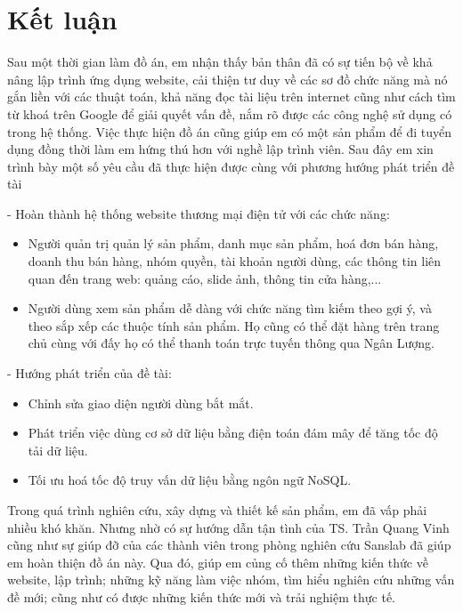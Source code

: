 \thispagestyle{plain}
\chapter*{Kết luận}
Sau một thời gian làm đồ án, em nhận thấy bản thân đã có sự tiến bộ về khả nâng lập trình ứng dụng website, cải thiện tư duy về các sơ đồ chức năng mà nó gắn liền với các thuật toán, khả năng đọc tài liệu trên internet cũng như cách tìm từ khoá trên Google để giải quyết vấn đề, nắm rõ được các công nghệ sử dụng có trong hệ thống. Việc thực hiện đồ án cũng giúp em có một sản phẩm để đi tuyển dụng đồng thời làm em hứng thú hơn với nghề lập trình viên. Sau đây em xin trình bày một số yêu cầu đã thực hiện được cùng với phương hướng phát triển đề tài
\par
- Hoàn thành hệ thống website thương mại điện tử với các chức năng:
\begin{itemize}
	\item Người quản trị quản lý sản phẩm, danh mục sản phẩm, hoá đơn bán hàng, doanh thu bán hàng, nhóm quyền, tài khoản người dùng, các thông tin liên quan đến trang web: quảng cáo, slide ảnh, thông tin cửa hàng,...
	\item Người dùng xem sản phẩm dễ dàng với chức năng tìm kiếm theo gợi ý, và theo sắp xếp các thuộc tính sản phẩm. Họ cũng có thể đặt hàng trên trang chủ cùng với đấy họ có thể thanh toán trực tuyến thông qua Ngân Lượng.
\end{itemize}

- Hướng phát triển của đề tài:
\begin{itemize}
\item Chỉnh sửa giao diện người dùng bắt mắt.
\item Phát triển việc dùng cơ sở dữ liệu bằng điện toán đám mây để tăng tốc độ tải dữ liệu.
\item Tối ưu hoá tốc độ truy vấn dữ liệu bằng ngôn ngữ NoSQL.
\end{itemize}
\par 
Trong quá trình nghiên cứu, xây dựng và thiết kế sản phẩm, em đã vấp phải nhiều khó khăn. Nhưng nhờ có sự hướng dẫn tận tình của TS. Trần Quang Vinh cũng như sự giúp đỡ của các thành viên trong phòng nghiên cứu Sanslab đã giúp em hoàn thiện đồ án này. Qua đó, giúp em củng cố thêm những kiến thức về website, lập trình; những kỹ năng làm việc nhóm, tìm hiểu nghiên cứu những vấn đề mới; cũng như có được những kiến thức mới và trải nghiệm thực tế.